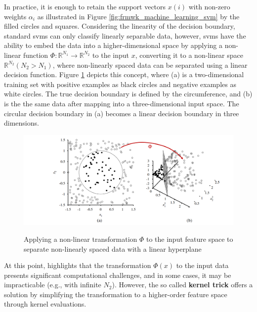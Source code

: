 In practice, it is enough to retain the support vectors $x(i)$ with non-zero weights $\alpha_i$ as illustrated in Figure \ref{fig:frmwk_machine_learning_svm} by the filled circles and squares. Considering the linearity of the decision boundary, standard \gls{svm}s can only classify linearly separable data, however, \gls{svm}s have the ability to embed the data into a higher-dimensional space by applying a non-linear function $\Phi: \mathbb{R}^{N_1} \rightarrow \mathbb{R}^{N_2}$ to the input $x$, converting it to a non-linear space $\mathbb{R}^{N_2} (N_2 > N_1)$, where non-linearly spaced data can be separated using a linear decision function. Figure \ref{fig:frmwk_machine_learning_svm_kernel_trick} depicts this concept, where (a) is a two-dimensional training set with positive examples as black circles and negative examples as white circles. The true decision boundary is defined by the circumference, and (b) is the the same data after mapping into a three-dimensional input space. The circular decision boundary in (a) becomes a linear decision boundary in three dimensions.

\begin{figure}[htbp]
    \raggedright
        \caption{Applying a non-linear transformation $\Phi$ to the input feature space to separate non-linearly spaced data with a linear hyperplane}
        \includegraphics[width=1\textwidth]{resources/images/030-theoretical_framework/Framework_machine_learning_SVM_kernel_trick.png}
        \label{fig:frmwk_machine_learning_svm_kernel_trick}
\end{figure}

At this point, \textcite{Russel2010} highlights that the transformation $\Phi(x)$ to the input data presents significant computational challenges, and in some cases, it may be impracticable (e.g., with infinite $N_2$). However, the so called \textbf{kernel trick} offers a solution by simplifying the transformation to a higher-order feature space through kernel evaluations. 

